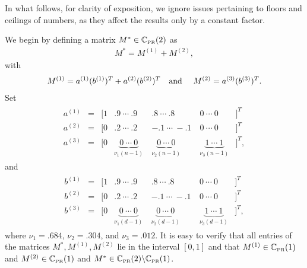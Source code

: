 \documentclass[11pt, hidelinks]{article} %
\newcommand{\numrows}{n}
\newcommand{\numcols}{d}
\newcommand{\wtmatrix}{M}
\newcommand{\wtstar}{\wtmatrix^*}
\newcommand{\matrixset}{\mathbb{C}}
\newcommand{\permset}{\matrixset_{\mbox{\tiny PR}}}
\newcommand{\permone}{\permset(1)}
\newcommand{\leftvec}{a}
\newcommand{\rightvec}{b}
\newcommand{\subveclength}{\nu}
\begin{document}
In what follows, for clarity of exposition, we ignore issues
pertaining to floors and ceilings of numbers, as they affect the
results only by a constant factor.

We begin by defining a matrix $\wtstar \in \permset(2)$ as
\begin{align*}
\wtstar = \wtmatrix^{(1)} + \wtmatrix^{(2)},
\end{align*}
with
\begin{align*}
\wtmatrix^{(1)} = \leftvec^{(1)} (\rightvec^{(1)})^T + \leftvec^{(2)} (\rightvec^{(2)})^T
\mbox{\quad and \quad} \wtmatrix^{(2)} = \leftvec^{(3)} (\rightvec^{(3)})^T.
\end{align*}
Set
\begin{align*}
\begin{matrix}
\leftvec^{(1)} & = & [1 & .9 ~ \cdots ~ .9 ~ & .8 ~ \cdots ~ .8 ~&0 ~ \cdots
  ~ 0 &]^T \\ \leftvec^{(2)} &=& [0 & .2 ~ \cdots ~ .2 ~ & -.1 ~ \cdots ~
  -.1~ &0 ~ \cdots ~ 0 &]^T\\ \leftvec^{(3)} & =& [0 & \underbrace{0 ~ \cdots
    ~ 0}_{\subveclength_1 (\numrows-1)} ~& \underbrace{0 ~ \cdots ~
    0}_{\subveclength_2 (\numrows-1)} ~ & \underbrace{1 ~ \cdots ~
    1}_{\subveclength_3 (\numrows-1)}&]^T,
\end{matrix}
\end{align*}
and
\begin{align*}
\begin{matrix}
\rightvec^{(1)} &=& [1 & .9 ~ \cdots ~ .9 ~ & .8 ~ \cdots ~ .8 ~&0 ~ \cdots ~
  0 &]^T \\ \rightvec^{(2)} &=& [0 & .2 ~ \cdots ~ .2 ~ & -.1 ~ \cdots ~ -.1 ~
  &0 ~ \cdots ~ 0 &]^T\\ \rightvec^{(3)} & =& [0 & \underbrace{0 ~ \cdots ~
    0}_{\subveclength_1 (\numcols-1)} ~& \underbrace{0 ~ \cdots ~
    0}_{\subveclength_2 (\numcols-1)} ~ & \underbrace{1 ~ \cdots ~
    1}_{\subveclength_3 (\numcols-1)}&]^T,
\end{matrix}
\end{align*}
where $\subveclength_1 = .684$, $\subveclength_2 = .304$, and
$\subveclength_3 = .012$. It is easy to verify that all entries of the
matrices $\wtstar, \wtmatrix^{(1)}, \wtmatrix^{(2)}$ lie in the
interval $[0,1]$ and that $\wtmatrix^{(1)} \in \permone$ and
$\wtmatrix^{(2)} \in \permone$ and $\wtstar \in \permset(2) \backslash
\permset(1)$.
\end{document}
